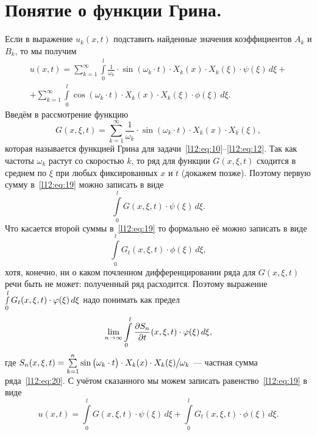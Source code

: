 \section{Понятие о функции Грина.}
\label{lecture12section3}
Если в выражение $u_k(x,t)$ подставить найденные значения коэффициентов $A_k$ и  $B_k$, то мы получим
\begin{multline}
	\label{l12:eq:19}
	u(x,t)=\sum\limits_{k=1}^{\infty}\int\limits_0^l\frac{1}{\omega_k}\cdot\sin(\omega_k\cdot t)\cdot X_k(x)\cdot X_k(\xi)\cdot\psi(\xi)\,d\xi+\\+ \sum\limits_{k=1}^{\infty}\int\limits_0^l\cos(\omega_k\cdot t)\cdot X_k(x)\cdot X_k(\xi)\cdot\phi(\xi)\,d\xi.
\end{multline}
Введём в рассмотрение функцию
\begin{equation}
	\label{l12:eq:20}
	 G(x,\xi,t)=\sum\limits_{k=1}^{\infty}\frac{1}{\omega_k}\cdot\sin(\omega_k\cdot t)\cdot X_k(x)\cdot X_k(\xi),
\end{equation}
которая называется функцией Грина для задачи~\eqref{l12:eq:10}--\eqref{l12:eq:12}. Так как частоты $\omega_k$ растут со скоростью $k$, то ряд для функции $G(x,\xi,t)$ сходится в среднем по $\xi$ при любых фиксированных $x$ и $t$ (докажем позже). Поэтому первую сумму в~\eqref{l12:eq:19} можно записать в виде 
\begin{equation*}
	\int\limits_0^l G(x,\xi,t)\cdot\psi(\xi)\,d\xi.
\end{equation*}
Что касается второй суммы в~\eqref{l12:eq:19} то формально её можно записать в виде 
\begin{equation*}
	\int\limits_0^l G_t(x,\xi,t)\cdot\phi(\xi)\,d\xi,
\end{equation*}
хотя, конечно, ни о каком почленном дифференцировании ряда для $G(x,\xi,t)$ речи быть не может: полученный ряд расходится. Поэтому выражение $\smallint\limits_0^l G_t(x,\xi,t)\cdot\phi(\xi)\,d\xi$ надо понимать как предел 
\begin{equation*}
	\lim\limits_{n\to\infty}\int\limits_0^l\pder{S_n}{t}(x,\xi,t)\cdot\phi(\xi)\,d\xi,
\end{equation*}
где $S_n(x,\xi,t)=\sum\limits_{k=1}^n\sin\big(\omega_k\cdot t\big)\cdot X_k(x)\cdot X_k(\xi)\!\!\bigm/\!\!\omega_k$ --- частная сумма ряда~\eqref{l12:eq:20}. С учётом сказанного мы можем записать равенство~\eqref{l12:eq:19} в виде
\begin{equation}
	\label{l12:eq:21}
	 u(x,t)=\int\limits_0^l G(x,\xi,t)\cdot\psi(\xi)\,d\xi+\int\limits_0^l G_t(x,\xi,t)\cdot\phi(\xi)\,d\xi.
\end{equation}
